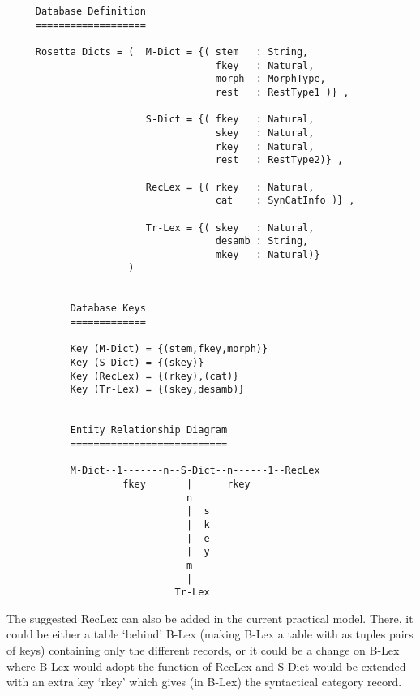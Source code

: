 \begin{description}
\begin{verbatim}
     Database Definition
     ===================
           
     Rosetta Dicts = (  M-Dict = {( stem   : String,
                                    fkey   : Natural,
                                    morph  : MorphType,
                                    rest   : RestType1 )} ,
           
                        S-Dict = {( fkey   : Natural,
                                    skey   : Natural,
                                    rkey   : Natural,
                                    rest   : RestType2)} ,
           
                        RecLex = {( rkey   : Natural,
                                    cat    : SynCatInfo )} ,
                
                        Tr-Lex = {( skey   : Natural,
                                    desamb : String,
                                    mkey   : Natural)}
                     )
           
           
           Database Keys
           =============
           
           Key (M-Dict) = {(stem,fkey,morph)}
           Key (S-Dict) = {(skey)}
           Key (RecLex) = {(rkey),(cat)}
           Key (Tr-Lex) = {(skey,desamb)}
           
           
           Entity Relationship Diagram
           ===========================
           
           M-Dict--1-------n--S-Dict--n------1--RecLex
                    fkey       |      rkey
                               n
                               |  s
                               |  k
                               |  e
                               |  y
                               m
                               |
                             Tr-Lex
\end{verbatim}      

        The suggested RecLex can also be added in the current practical model.
        There, it could be either a table `behind' B-Lex (making B-Lex a table
        with as tuples pairs of keys) containing only the different records, 
        or it could be a change on B-Lex where B-Lex would adopt the function of
        RecLex and S-Dict would be extended with an extra key `rkey' which 
        gives (in B-Lex) the syntactical category record.
\end{description}

